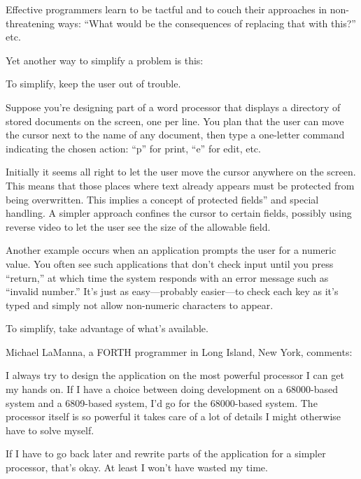 \noindent Effective programmers learn to be tactful and to couch their
approaches in non-threatening ways: ``What would be the consequences
of replacing that with this?'' etc.

Yet another way to simplify a problem is this:

\begin{tip}
To simplify, keep the user out of trouble.
\end{tip}
Suppose you're designing part of a word processor that displays a
directory of stored documents on the screen, one per line. You plan
that the
user can move the cursor next to the name of any document, then type a
one-letter command indicating the chosen action: ``p'' for print,
``e'' for edit, etc.

Initially it seems all right to let the user move the cursor anywhere
on the screen. This means that those places where text already appears
must be protected from being overwritten. This implies a concept of
protected fields'' and special handling. A simpler approach confines
the cursor to certain fields, possibly using reverse video to let the
user see the size of the allowable field.

Another example occurs when an application prompts the user for a
numeric value. You often see such applications that don't check input
until you press ``return,'' at which time the system responds with an
error message such as ``invalid number.'' It's just as easy---probably
easier---to check each key as it's typed and simply not allow
non-numeric characters to appear.

\begin{tip}
To simplify, take advantage of what's available.
\end{tip}

\bigskip\blackline{2ex}
\noindent Michael LaManna, a FORTH programmer in Long Island, New York,
comments:

\begin{tfquot}
I always try to design the application on the most powerful processor
I can get my hands on. If I have a choice between doing development on
a 68000-based system and a 6809-based system, I'd go for the
68000-based system. The processor itself is so powerful it takes care
of a lot of details I might otherwise have to solve myself.

If I have to go back later and rewrite parts of the application for a
simpler processor, that's okay. At least I won't have wasted my time.
\end{tfquot}
\blackline{2ex}

